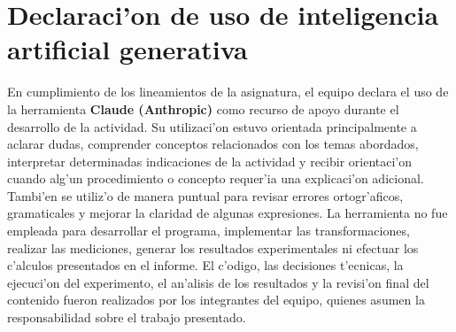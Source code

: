 \documentclass[10pt,journal]{IEEEtran}
\begin{document}
\section*{Declaraci'on de uso de inteligencia artificial generativa}
En cumplimiento de los lineamientos de la asignatura, el equipo declara el uso
de la herramienta \textbf{Claude (Anthropic)} como recurso de apoyo durante el
desarrollo de la actividad. Su utilizaci'on estuvo orientada principalmente a
aclarar dudas, comprender conceptos relacionados con los temas abordados,
interpretar determinadas indicaciones de la actividad y recibir orientaci'on
cuando alg'un procedimiento o concepto requer'ia una explicaci'on adicional.
Tambi'en se utiliz'o de manera puntual para revisar errores ortogr'aficos,
gramaticales y mejorar la claridad de algunas expresiones. La herramienta no
fue empleada para desarrollar el programa, implementar las transformaciones,
realizar las mediciones, generar los resultados experimentales ni efectuar los
c'alculos presentados en el informe. El c'odigo, las decisiones t'ecnicas, la
ejecuci'on del experimento, el an'alisis de los resultados y la revisi'on
final del contenido fueron realizados por los integrantes del equipo, quienes
asumen la responsabilidad sobre el trabajo presentado.

\printbibliography[title={Referencias}]
\end{document}
